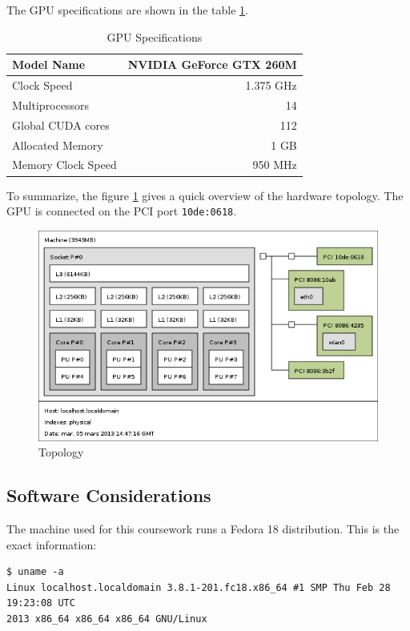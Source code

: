 \documentclass{egpubl}
\begin{document}
The GPU specifications are shown in the table \ref{GPUspecs}.

\begin{table}[h]
\centering
\begin{tabular}{|l|r|}
\hline
Model Name & NVIDIA GeForce GTX 260M \\
\hline
Clock Speed & 1.375 GHz \\
\hline
Multiprocessors & 14 \\
\hline
Global CUDA cores & 112 \\
\hline
Allocated Memory & 1 GB \\
\hline
Memory Clock Speed & 950 MHz \\
\hline
\end{tabular}
\caption{GPU Specifications}
\label{GPUspecs}
\end{table}

To summarize, the figure \ref{topo} gives a quick overview of the hardware topology. The GPU is connected on the PCI port \verb+10de:0618+.

\begin{figure}[h]
\centering
\includegraphics[scale=0.35]{topo.png}
\caption{Topology}
\label{topo}
\end{figure}

\subsection{Software Considerations}

The machine used for this coursework runs a Fedora 18 distribution. This is the exact information:
\begin{lstlisting}
$ uname -a
Linux localhost.localdomain 3.8.1-201.fc18.x86_64 #1 SMP Thu Feb 28 19:23:08 UTC
2013 x86_64 x86_64 x86_64 GNU/Linux
\end{lstlisting}
\end{document}
